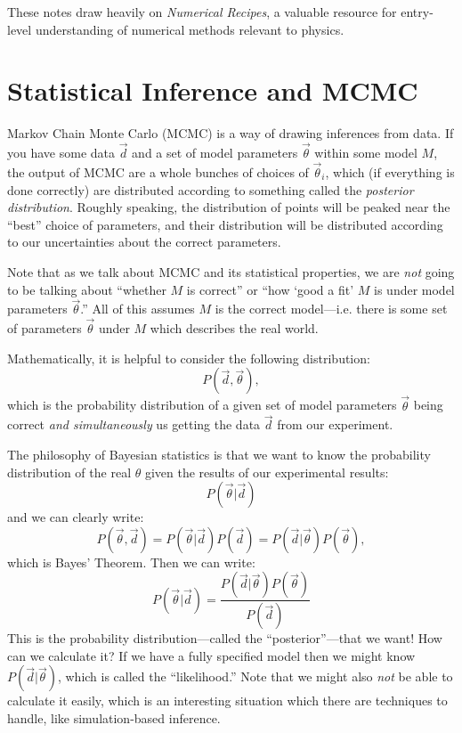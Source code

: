 These notes draw heavily on {\it Numerical Recipes}, a valuable
resource for entry-level understanding of numerical methods relevant
to physics.

\section{Statistical Inference and MCMC}

Markov Chain Monte Carlo (MCMC) is a way of drawing inferences from
data. If you have some data $\vec{d}$ and a set of model parameters
$\vec{\theta}$ within some model $M$, the output of MCMC are a whole
bunches of choices of $\vec{\theta}_i$, which (if everything is done
correctly) are distributed according to something called the {\it
  posterior distribution}. Roughly speaking, the distribution of
points will be peaked near the ``best'' choice of parameters, and
their distribution will be distributed according to our uncertainties
about the correct parameters.

Note that as we talk about MCMC and its statistical properties, we are
{\it not} going to be talking about ``whether $M$ is correct'' or
``how `good a fit' $M$ is under model parameters $\vec{\theta}$.'' All
of this assumes $M$ is the correct model---i.e. there is some set of
parameters $\vec{\theta}$ under $M$ which describes the real world. 

Mathematically, it is helpful to consider the following distribution:
\begin{equation}
P(\vec{d}, \vec{\theta}),
\end{equation}
which is the probability distribution of a given set of model
parameters $\vec{\theta}$ being correct {\it and simultaneously} us
getting the data $\vec{d}$ from our experiment.

The philosophy of Bayesian statistics is that we want to know the
probability distribution of the real $\theta$ given the results of our
experimental results:
\begin{equation}
P(\vec{\theta} | \vec{d} )
\end{equation}
and we can clearly write:
\begin{equation}
P(\vec{\theta} , \vec{d} ) = 
P(\vec{\theta} | \vec{d} ) P(\vec{d}) = 
P(\vec{d} | \vec{\theta} ) P(\vec{\theta}),
\end{equation}
which is Bayes' Theorem. Then we can write:
\begin{equation}
P(\vec{\theta} | \vec{d} ) = 
\frac{P(\vec{d} | \vec{\theta} ) P(\vec{\theta})}
{P(\vec{d})}
\end{equation}
This is the probability distribution---called the ``posterior''---that
we want! How can we calculate it? If we have a fully specified model
then we might know $P(\vec{d}|\vec{\theta})$, which is called the
``likelihood.'' Note that we might also {\it not} be able to calculate
it easily, which is an interesting situation which there are
techniques to handle, like simulation-based inference.

